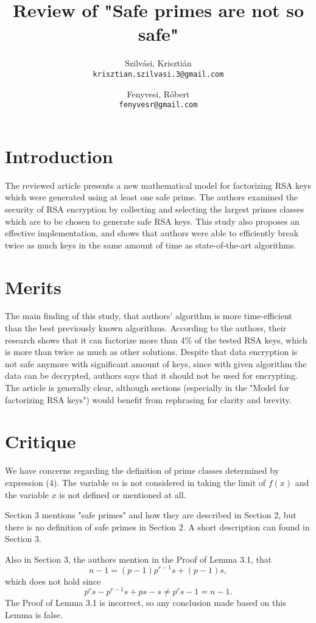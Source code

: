 \documentclass[11 pt,a4paper,english]{article}
\title{Review of "Safe primes are not so safe"}
\author{
	Szilvási, Krisztián\\
	\texttt{krisztian.szilvasi.3@gmail.com}
	\and
	Fenyvesi, Róbert\\
	\texttt{fenyvesr@gmail.com}
}
\begin{document}
\maketitle

\newpage

\section{Introduction}
The reviewed article \cite{safeprimes} presents a new mathematical model for factorizing RSA keys which were generated using at least one safe prime. 
The authors examined the security of RSA encryption by collecting and selecting the largest primes classes which are to be chosen to generate safe RSA keys. 
This study also proposes an effective implementation, and shows that authors were able to efficiently break twice as much keys in the same amount of time as state-of-the-art algorithms. 


\section{Merits}
The main finding of this study, that authors' algorithm is more time-efficient than the best previously known algorithms. According to the authors, their research shows that it can factorize more than 4\% of the tested RSA keys, which is more than twice as much as other solutions. 
Despite that data encryption is not safe anymore with significant amount of keys, since with given algorithm the data can be decrypted, authors says that it should not be used for encrypting. 
The article is generally clear, although sections (especially in the "Model for factorizing RSA keys") would benefit from rephrasing for clarity and brevity.


\section{Critique}

We have concerns regarding the definition of prime classes determined by expression (4). The variable $m$ is not considered in taking the limit of $f(x)$ and the variable $x$ is not defined or mentioned at all.

Section 3 mentions "safe primes" and how they are described in Section 2, but there is no definition of safe primes in Section 2. A short description can found in Section 3.

Also in Section 3, the authors mention in the Proof of Lemma 3.1, that $$n-1=(p-1)p^{r-1}s+(p-1)s,$$ which does not hold since $$p^rs-p^{r-1}s+ps-s \neq p^rs-1=n-1.$$ The Proof of Lemma 3.1 is incorrect, so any conclusion made based on this Lemma is false.
\end{document}
